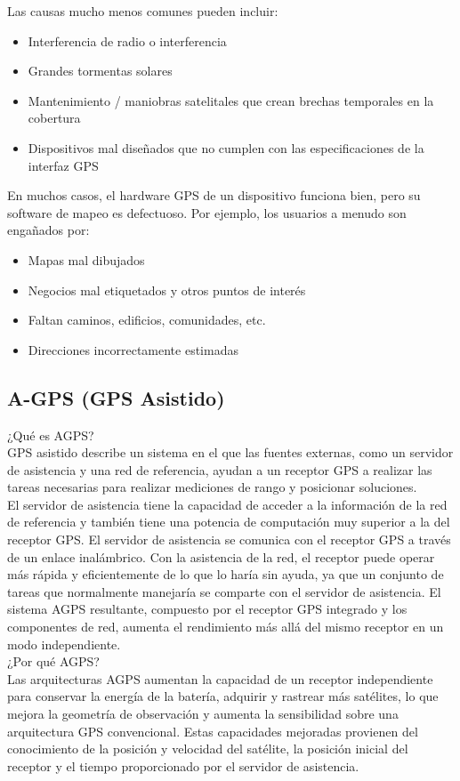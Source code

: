 Las causas mucho menos comunes pueden incluir:
\begin{itemize}
	\item Interferencia de radio o interferencia
	\item Grandes tormentas solares
	\item Mantenimiento / maniobras satelitales que crean brechas temporales en la cobertura
	\item Dispositivos mal diseñados que no cumplen con las especificaciones de la interfaz GPS
\end{itemize}

En muchos casos, el hardware GPS de un dispositivo funciona bien, pero su software de mapeo es defectuoso. Por ejemplo, los usuarios a menudo son engañados por:
\begin{itemize}
	\item Mapas mal dibujados
	\item Negocios mal etiquetados y otros puntos de interés
	\item Faltan caminos, edificios, comunidades, etc.
	\item Direcciones incorrectamente estimadas
\end{itemize}

\subsection{A-GPS (GPS Asistido)}

¿Qué es AGPS? \\
GPS asistido describe un sistema en el que las fuentes externas, como un servidor de asistencia y una red de referencia, ayudan a un receptor GPS a realizar las tareas necesarias para realizar mediciones de rango y posicionar soluciones.\\
El servidor de asistencia tiene la capacidad de acceder a la información de la red de referencia y también tiene una potencia de computación muy superior a la del receptor GPS. El servidor de asistencia se comunica con el receptor GPS a través de un enlace inalámbrico. Con la asistencia de la red, el receptor puede operar más rápida y eficientemente de lo que lo haría sin ayuda, ya que un conjunto de tareas que normalmente manejaría se comparte con el servidor de asistencia. El sistema AGPS resultante, compuesto por el receptor GPS integrado y los componentes de red, aumenta el rendimiento más allá del mismo receptor en un modo independiente.\\

¿Por qué AGPS? \\
Las arquitecturas AGPS aumentan la capacidad de un receptor independiente para conservar la energía de la batería, adquirir y rastrear más satélites, lo que mejora la geometría de observación y aumenta la sensibilidad sobre una arquitectura GPS convencional. Estas capacidades mejoradas provienen del conocimiento de la posición y velocidad del satélite, la posición inicial del receptor y el tiempo proporcionado por el servidor de asistencia. \\

